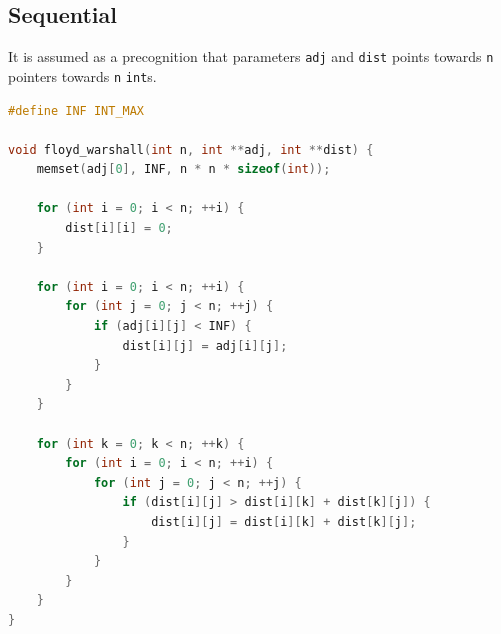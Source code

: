 \documentclass{article}
\begin{document}
\subsection{Sequential}
It is assumed as a precognition that parameters \verb|adj| and \verb|dist| points towards \verb|n| pointers towards \verb|n| \verb|int|s.
\begin{lstlisting}[caption={Sequential implementation in C}, language=C]
#define INF INT_MAX

void floyd_warshall(int n, int **adj, int **dist) {
    memset(adj[0], INF, n * n * sizeof(int));

    for (int i = 0; i < n; ++i) {
        dist[i][i] = 0;
    }

    for (int i = 0; i < n; ++i) {
        for (int j = 0; j < n; ++j) {
            if (adj[i][j] < INF) {
                dist[i][j] = adj[i][j];
            }
        }
    }

    for (int k = 0; k < n; ++k) {
        for (int i = 0; i < n; ++i) {
            for (int j = 0; j < n; ++j) {
                if (dist[i][j] > dist[i][k] + dist[k][j]) {
                    dist[i][j] = dist[i][k] + dist[k][j];
                }
            }
        }
    }
}
\end{lstlisting}
\end{document}

